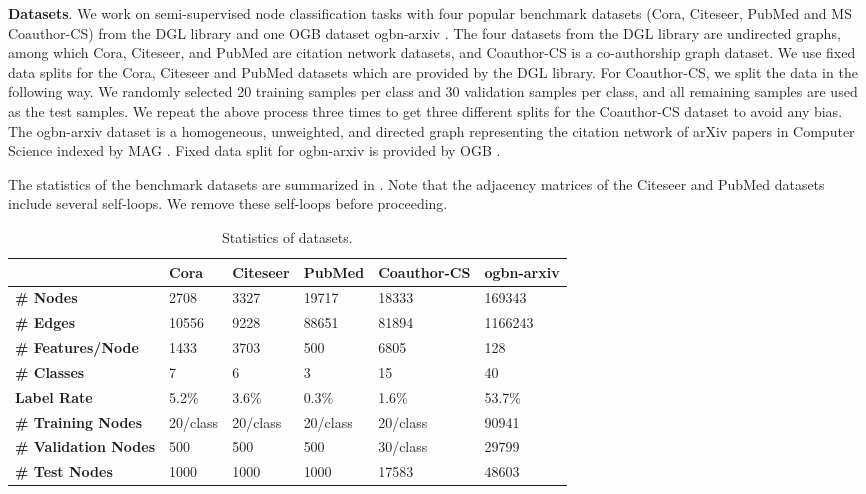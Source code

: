 \documentclass[lettersize,journal]{IEEEtran}
\theoremstyle{plain}
\theoremstyle{definition}
\theoremstyle{remark}
\begin{document}
\textbf{Datasets}. We work on semi-supervised node classification tasks with four popular benchmark datasets (Cora, Citeseer, PubMed and MS Coauthor-CS) from the DGL library \cite{wang2019dgl} and one OGB dataset ogbn-arxiv \cite{hu2020ogb}. The four datasets from the DGL library are undirected graphs, among which Cora, Citeseer, and PubMed are citation network datasets, and Coauthor-CS is a co-authorship graph dataset. We use fixed data splits for the Cora, Citeseer and PubMed datasets which are provided by the DGL library. For Coauthor-CS, we split the data in the following way. We randomly selected 20 training samples per class and 30 validation samples per class, and all remaining samples are used as the test samples. We repeat the above process three times to get three different splits for the Coauthor-CS dataset to avoid any bias. The ogbn-arxiv dataset is a homogeneous, unweighted, and directed graph representing the citation network of arXiv papers in Computer Science indexed by MAG \cite{wang2020microsoft}. Fixed data split for ogbn-arxiv is provided by OGB \cite{hu2020ogb}.

The statistics of the benchmark datasets are summarized in . Note that the adjacency matrices of the Citeseer and PubMed datasets include several self-loops. We remove these self-loops before proceeding.

\begin{table*}[t]
	\caption{Statistics of datasets.}
	\label{tb:datasets}
	\begin{center}
			\begin{tabular}{llllll}
				\toprule
				\textbf{} &\textbf{Cora} &\textbf{Citeseer} &\textbf{PubMed} &\textbf{Coauthor-CS} &\textbf{ogbn-arxiv}\\
				\midrule
				\textbf{\# Nodes}           &2708  &3327  &19717  &18333 &169343\\
				\textbf{\# Edges}           &10556  &9228  &88651  &81894 &1166243\\
				\textbf{\# Features/Node}   &1433 &3703  &500  &6805  &128\\
				\textbf{\# Classes}         &7 &6  &3  &15  &40\\
				\textbf{Label Rate}      &5.2\%  &3.6\%  &0.3\%  &1.6\%  &53.7\%\\
				\textbf{\# Training Nodes}        &20/class &20/class  &20/class  &20/class  &90941\\
				\textbf{\# Validation Nodes}      &500  &500  &500  &30/class   &29799\\
				\textbf{\# Test Nodes}            &1000  &1000  &1000  &17583  &48603\\
				\bottomrule
			\end{tabular}
	\end{center}
\end{table*}
\end{document}
